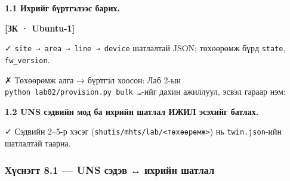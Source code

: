\textbf{1.1 Ихрийг бүртгэлээс барих.}

\textbf{{[}ЗК · Ubuntu-1{]}}

\begin{Shaded}
\begin{Highlighting}[]
 \KeywordTok{|} 
\end{Highlighting}
\end{Shaded}

✓ \texttt{site\ →\ area\ →\ line\ →\ device} шатлалтай JSON; төхөөрөмж бүрд \texttt{state}, \texttt{fw\_version}.

✗ Төхөөрөмж алга → бүртгэл хоосон: Лаб 2-ын \texttt{python\ lab02/\allowbreak{}provision.\allowbreak{}py\ bulk\ \ldots{}}-ийг дахин ажиллуул, эсвэл гараар нэм:

\begin{Shaded}
\begin{Highlighting}[]
\end{Highlighting}
\end{Shaded}

\textbf{1.2 UNS сэдвийн мод ба ихрийн шатлал ИЖИЛ эсэхийг батлах.}

\begin{Shaded}
\begin{Highlighting}[]
\end{Highlighting}
\end{Shaded}

✓ Сэдвийн 2--5-р хэсэг (\texttt{shutis/\allowbreak{}mhts/\allowbreak{}lab/\allowbreak{}\textless{}төхөөрөмж\textgreater{}}) нь \texttt{twin.json}-ийн шатлалтай таарна.

\hypertarget{ux445ux4afux441ux43dux44dux433ux442-8.1-uns-ux441ux44dux434ux44dux432-ux438ux445ux440ux438ux439ux43d-ux448ux430ux442ux43bux430ux43b}{%
\subsubsection{Хүснэгт 8.1 --- UNS сэдэв ↔ ихрийн шатлал}\label{ux445ux4afux441ux43dux44dux433ux442-8.1-uns-ux441ux44dux434ux44dux432-ux438ux445ux440ux438ux439ux43d-ux448ux430ux442ux43bux430ux43b}}

